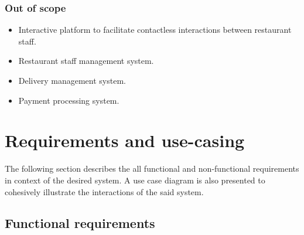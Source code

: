 \documentclass[12pt, a4paper]{article}
\theoremstyle{styleth}
\theoremstyle{styledef}
\begin{document}
\subsubsection{Out of scope}
\begin{itemize}
	\item Interactive platform to facilitate contactless interactions between
	restaurant staff.
	\item Restaurant staff management system.
	\item Delivery management system.
	\item Payment processing system.
\end{itemize}

\section{Requirements and use-casing}
The following section describes the all functional and non-functional requirements in context of the desired system. A use case diagram is also presented to cohesively illustrate the interactions of the said system.

\subsection{Functional requirements}
\end{document}
